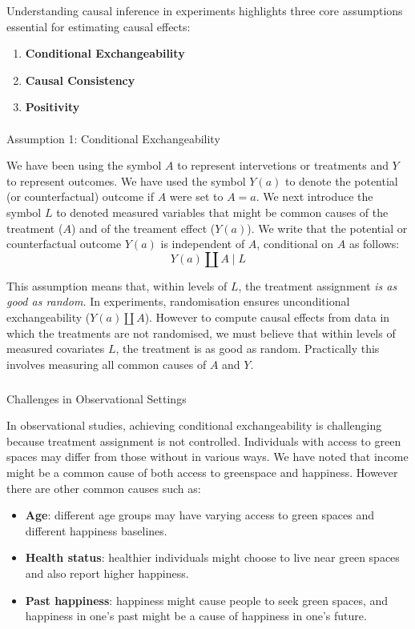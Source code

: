 \documentclass[
  singlecolumn]{article}
\makeatletter
\let\oldparagraph\paragraph
\renewcommand{\paragraph}{
    \@ifstar
      \xxxParagraphStar
      \xxxParagraphNoStar
  }
\newcommand{\xxxParagraphStar}[1]{\oldparagraph*{#1}\mbox{}}
\newcommand{\xxxParagraphNoStar}[1]{\oldparagraph{#1}\mbox{}}
\let\oldsubparagraph\subparagraph
\renewcommand{\subparagraph}{
    \@ifstar
      \xxxSubParagraphStar
      \xxxSubParagraphNoStar
  }
\newcommand{\xxxSubParagraphStar}[1]{\oldsubparagraph*{#1}\mbox{}}
\newcommand{\xxxSubParagraphNoStar}[1]{\oldsubparagraph{#1}\mbox{}}
\providecommand{\tightlist}{%
  \setlength{\itemsep}{0pt}\setlength{\parskip}{0pt}}\usepackage{longtable,booktabs,array}
\makeatother
\begin{document}
Understanding causal inference in experiments highlights three core
assumptions essential for estimating causal effects:

\begin{enumerate}
\def\labelenumi{\arabic{enumi}.}
\tightlist
\item
  \textbf{Conditional Exchangeability}
\item
  \textbf{Causal Consistency}
\item
  \textbf{Positivity}
\end{enumerate}

\paragraph{Assumption 1: Conditional
Exchangeability}\label{assumption-1-conditional-exchangeability}

We have been using the symbol \(A\) to represent intervetions or
treatments and \(Y\) to represent outcomes. We have used the symbol
\(Y(a)\) to denote the potential (or counterfactual) outcome if \(A\)
were set to \(A = a\). We next introduce the symbol \(L\) to denoted
measured variables that might be common causes of the treatment (\(A\))
and of the treament effect (\(Y(a)\)). We write that the potential or
counterfactual outcome \(Y(a)\) is independent of \(A\), conditional on
\(A\) as follows: \[
Y(a) \coprod A \mid L
\]

This assumption means that, within levels of \(L\), the treatment
assignment \emph{is as good as random.} In experiments, randomisation
ensures unconditional exchangeability (\(Y(a) \coprod  A\)). However to
compute causal effects from data in which the treatments are not
randomised, we must believe that within levels of measured covariates
\(L\), the treatment is as good as random. Practically this involves
measuring all common causes of \(A\) and \(Y\).

\subparagraph{Challenges in Observational
Settings}\label{challenges-in-observational-settings}

In observational studies, achieving conditional exchangeability is
challenging because treatment assignment is not controlled. Individuals
with access to green spaces may differ from those without in various
ways. We have noted that income might be a common cause of both access
to greenspace and happiness. However there are other common causes such
as:

\begin{itemize}
\tightlist
\item
  \textbf{Age}: different age groups may have varying access to green
  spaces and different happiness baselines.
\item
  \textbf{Health status}: healthier individuals might choose to live
  near green spaces and also report higher happiness.
\item
  \textbf{Past happiness}: happiness might cause people to seek green
  spaces, and happiness in one's past might be a cause of happiness in
  one's future.
\end{itemize}
\end{document}
